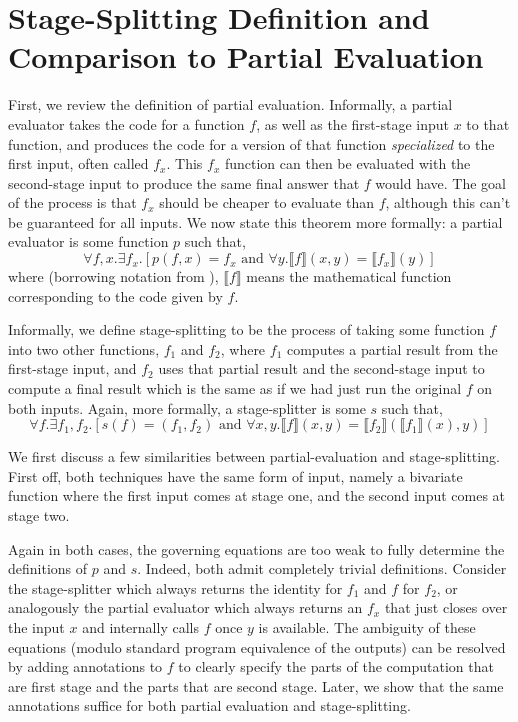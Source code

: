 
\section{Stage-Splitting Definition and Comparison to Partial Evaluation}

First, we review the definition of partial evaluation.  Informally, a partial evaluator takes the code for a function $f$, as well as the first-stage input $x$ to that function, and produces the code for a version of that function {\em specialized} to the first input, often called $f_x$.  This $f_x$ function can then be evaluated with the second-stage input to produce the same final answer that $f$ would have.  The goal of the process is that $f_x$ should be cheaper to evaluate than $f$, although this can't be guaranteed for all inputs.  We now state this theorem more formally: a partial evaluator is some function $p$ such that,
\[
	\forall f,x. \exists f_x. [p(f,x) = f_x \text{ and } \forall y.\llbracket f \rrbracket(x,y)=\llbracket f_x \rrbracket(y)]
\]
where (borrowing notation from \cite{jones96}), $\llbracket f \rrbracket$ means the mathematical function corresponding to the code given by $f$.

Informally, we define stage-splitting to be the process of taking some function $f$ into two other functions, $f_1$ and $f_2$, where $f_1$ computes a partial result from the first-stage input, and $f_2$ uses that partial result and the second-stage input to compute a final result which is the same as if we had just run the original $f$ on both inputs.  Again, more formally, a stage-splitter is some $s$ such that,
\[
	\forall f. \exists f_1,f_2. [s(f) = (f_1,f_2) \text{ and } 
	\forall x,y.\llbracket f \rrbracket(x,y)=\llbracket f_2 \rrbracket(\llbracket f_1 \rrbracket(x),y)]
\]

We first discuss a few similarities between partial-evaluation and stage-splitting.  First off, both techniques have the same form of input, namely a bivariate function where the first input comes at stage one, and the second input comes at stage two.  

Again in both cases, the governing equations are too weak to fully determine the definitions of $p$ and $s$.  Indeed, both admit completely trivial definitions.  Consider the stage-splitter which always returns the identity for $f_1$ and $f$ for $f_2$, or analogously the partial evaluator which always returns an $f_x$ that just closes over the input $x$ and internally calls $f$ once $y$ is available. The ambiguity of these equations (modulo standard program equivalence of the outputs) can be resolved by adding annotations to $f$ to clearly specify the parts of the computation that are first stage and the parts that are second stage.  Later, we show that the same annotations suffice for both partial evaluation and stage-splitting.  

